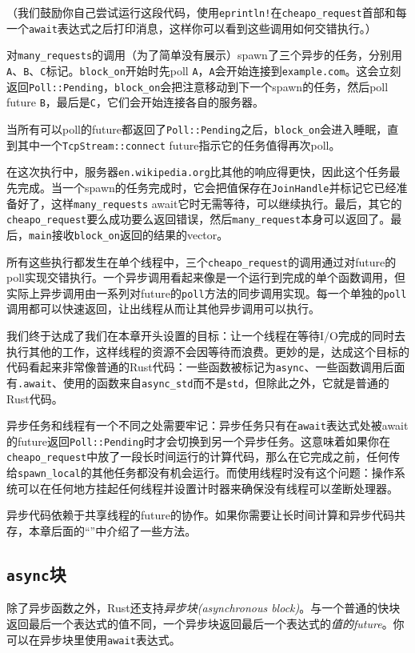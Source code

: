 （我们鼓励你自己尝试运行这段代码，使用\texttt{eprintln!}在\texttt{cheapo\_request}首部和每一个\texttt{await}表达式之后打印消息，这样你可以看到这些调用如何交错执行。）

对\texttt{many\_requests}的调用（为了简单没有展示）spawn了三个异步的任务，分别用\texttt{A}、\texttt{B}、\texttt{C}标记。\texttt{block\_on}开始时先poll \texttt{A}，\texttt{A}会开始连接到\texttt{example.com}。这会立刻返回\texttt{Poll::Pending}，\texttt{block\_on}会把注意移动到下一个spawn的任务，然后poll future \texttt{B}，最后是\texttt{C}，它们会开始连接各自的服务器。

当所有可以poll的future都返回了\texttt{Poll::Pending}之后，\texttt{block\_on}会进入睡眠，直到其中一个\texttt{TcpStream::connect} future指示它的任务值得再次poll。

在这次执行中，服务器\texttt{en.wikipedia.org}比其他的响应得更快，因此这个任务最先完成。当一个spawn的任务完成时，它会把值保存在\texttt{JoinHandle}并标记它已经准备好了，这样\texttt{many\_requests} await它时无需等待，可以继续执行。最后，其它的\texttt{cheapo\_request}要么成功要么返回错误，然后\texttt{many\_request}本身可以返回了。最后，\texttt{main}接收\texttt{block\_on}返回的结果的vector。

所有这些执行都发生在单个线程中，三个\texttt{cheapo\_request}的调用通过对future的poll实现交错执行。一个异步调用看起来像是一个运行到完成的单个函数调用，但实际上异步调用由一系列对future的\texttt{poll}方法的同步调用实现。每一个单独的\texttt{poll}调用都可以快速返回，让出线程从而让其他异步调用可以执行。

我们终于达成了我们在本章开头设置的目标：让一个线程在等待I/O完成的同时去执行其他的工作，这样线程的资源不会因等待而浪费。更妙的是，达成这个目标的代码看起来非常像普通的Rust代码：一些函数被标记为\texttt{async}、一些函数调用后面有\texttt{.await}、使用的函数来自\texttt{async\_std}而不是\texttt{std}，但除此之外，它就是普通的Rust代码。

异步任务和线程有一个不同之处需要牢记：异步任务只有在\texttt{await}表达式处被await的future返回\texttt{Poll::Pending}时才会切换到另一个异步任务。这意味着如果你在\texttt{cheapo\_request}中放了一段长时间运行的计算代码，那么在它完成之前，任何传给\texttt{spawn\_local}的其他任务都没有机会运行。而使用线程时没有这个问题：操作系统可以在任何地方挂起任何线程并设置计时器来确保没有线程可以垄断处理器。

异步代码依赖于共享线程的future的协作。如果你需要让长时间计算和异步代码共存，本章后面的“”中介绍了一些方法。

\subsection{\texttt{async}块}
除了异步函数之外，Rust还支持\emph{异步块(asynchronous block)}。与一个普通的快块返回最后一个表达式的值不同，一个异步块返回最后一个表达式的\emph{值的future}。你可以在异步块里使用\texttt{await}表达式。

